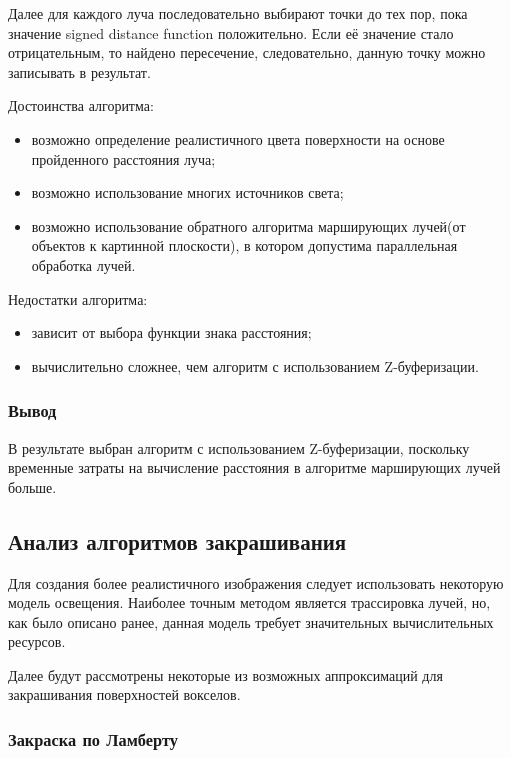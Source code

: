 Далее для каждого луча последовательно выбирают точки до тех пор, пока значение signed distance function положительно. Если её значение стало отрицательным, то найдено пересечение, следовательно, данную точку можно записывать в результат.

Достоинства алгоритма:
\begin{itemize}
    \item возможно определение реалистичного цвета поверхности на основе пройденного расстояния луча;
    \item возможно использование многих источников света;
    \item возможно использование обратного алгоритма марширующих лучей(от объектов к картинной плоскости), в котором допустима параллельная обработка лучей.
\end{itemize}

Недостатки алгоритма:
\begin{itemize}
    \item зависит от выбора функции знака расстояния;
    \item вычислительно сложнее, чем алгоритм с использованием Z-буферизации\cite{site:raymarching}.
\end{itemize}

\subsubsection{Вывод}

В результате выбран алгоритм с использованием Z-буферизации, поскольку временные
затраты на вычисление расстояния в алгоритме марширующих лучей больше.

\subsection{Анализ алгоритмов закрашивания}

Для создания более реалистичного изображения следует использовать некоторую модель освещения.
Наиболее точным методом является трассировка лучей\cite{site:raymarching}, но, как было описано ранее, данная модель требует значительных вычислительных ресурсов.

Далее будут рассмотрены некоторые из возможных аппроксимаций для закрашивания поверхностей вокселов.

\subsubsection{Закраска по Ламберту}

